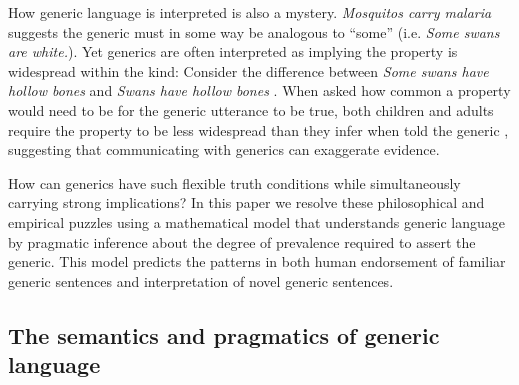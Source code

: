 \documentclass[12pt,letterpaper]{article}
\newcommand{\ndg}[1]{\textcolor{Green}{[ndg: #1]}}
\begin{document}

How generic language is interpreted is also a mystery.
\emph{Mosquitos carry malaria} suggests the generic must in some way be analogous to ``some'' (i.e. \emph{Some swans are white.}). 
Yet generics are often interpreted as implying the property is widespread within the kind:
Consider the difference between \emph{Some swans have hollow bones} and \emph{Swans have hollow bones} \cite{Gelman2002}.
When asked how common a property would need to be for the generic utterance to be true, both children and adults require the property to be less widespread than they infer when told the generic \cite{Cimpian2010,Brandone2014}, suggesting that communicating with generics can exaggerate evidence.

How can generics have such flexible truth conditions while simultaneously carrying strong implications?
In this paper we resolve these philosophical and empirical puzzles using a mathematical model that understands generic language by pragmatic inference about the degree of prevalence required to assert the generic.  
This model predicts the patterns in both human endorsement of familiar generic sentences and interpretation of novel generic sentences. 

\subsection*{The semantics and pragmatics of generic language}
\end{document}
